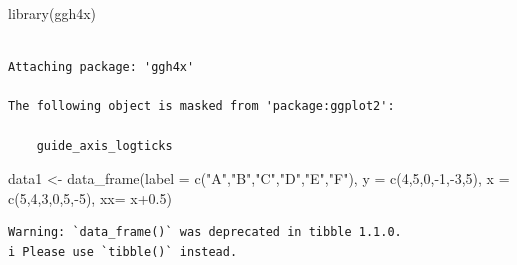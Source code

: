 \documentclass[
  letterpaper,
  DIV=11,
  numbers=noendperiod]{scrartcl}
\newenvironment{Shaded}{\begin{snugshade}}{\end{snugshade}}
\newcommand{\AttributeTok}[1]{\textcolor[rgb]{0.40,0.45,0.13}{#1}}
\newcommand{\DecValTok}[1]{\textcolor[rgb]{0.68,0.00,0.00}{#1}}
\newcommand{\FloatTok}[1]{\textcolor[rgb]{0.68,0.00,0.00}{#1}}
\newcommand{\FunctionTok}[1]{\textcolor[rgb]{0.28,0.35,0.67}{#1}}
\newcommand{\NormalTok}[1]{\textcolor[rgb]{0.00,0.23,0.31}{#1}}
\newcommand{\OtherTok}[1]{\textcolor[rgb]{0.00,0.23,0.31}{#1}}
\newcommand{\SpecialCharTok}[1]{\textcolor[rgb]{0.37,0.37,0.37}{#1}}
\newcommand{\StringTok}[1]{\textcolor[rgb]{0.13,0.47,0.30}{#1}}
\begin{document}
\begin{Shaded}
\begin{Highlighting}[]
\FunctionTok{library}\NormalTok{(ggh4x)}
\end{Highlighting}
\end{Shaded}

\begin{verbatim}

Attaching package: 'ggh4x'

The following object is masked from 'package:ggplot2':

    guide_axis_logticks
\end{verbatim}

\begin{Shaded}
\begin{Highlighting}[]
\NormalTok{data1 }\OtherTok{\textless{}{-}} \FunctionTok{data\_frame}\NormalTok{(}\AttributeTok{label =} \FunctionTok{c}\NormalTok{(}\StringTok{"A"}\NormalTok{,}\StringTok{"B"}\NormalTok{,}\StringTok{"C"}\NormalTok{,}\StringTok{"D"}\NormalTok{,}\StringTok{"E"}\NormalTok{,}\StringTok{"F"}\NormalTok{),}
                          \AttributeTok{y =} \FunctionTok{c}\NormalTok{(}\DecValTok{4}\NormalTok{,}\DecValTok{5}\NormalTok{,}\DecValTok{0}\NormalTok{,}\SpecialCharTok{{-}}\DecValTok{1}\NormalTok{,}\SpecialCharTok{{-}}\DecValTok{3}\NormalTok{,}\DecValTok{5}\NormalTok{),}
                          \AttributeTok{x =} \FunctionTok{c}\NormalTok{(}\DecValTok{5}\NormalTok{,}\DecValTok{4}\NormalTok{,}\DecValTok{3}\NormalTok{,}\DecValTok{0}\NormalTok{,}\DecValTok{5}\NormalTok{,}\SpecialCharTok{{-}}\DecValTok{5}\NormalTok{),}
                          \AttributeTok{xx=}\NormalTok{ x}\FloatTok{+0.5}\NormalTok{)}
\end{Highlighting}
\end{Shaded}

\begin{verbatim}
Warning: `data_frame()` was deprecated in tibble 1.1.0.
i Please use `tibble()` instead.
\end{verbatim}
\end{document}
